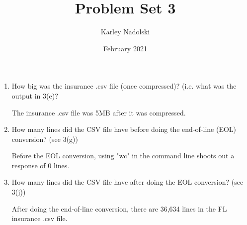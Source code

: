 \documentclass{article}
\title{Problem Set 3}
\author{Karley Nadolski }
\date{February 2021}
\begin{document}
\maketitle

\begin{enumerate}
    \item How big was the insurance .csv file (once compressed)? (i.e. what was the output in 3(e)? 
    
    The insurance .csv file was 5MB after it was compressed. 
    
    \item How many lines did the CSV file have before doing the end-of-line (EOL) conversion? (see 3(g))
    
    Before the EOL conversion, using "wc" in the command line shoots out a response of 0 lines. 
    
    \item How many lines did the CSV file have after doing the EOL conversion? (see 3(j))
    
    After doing the end-of-line conversion, there are 36,634 lines in the FL insurance .csv file.
    
\end{enumerate}
\end{document}
